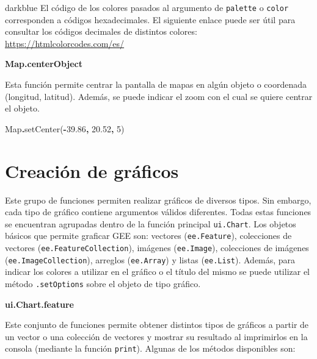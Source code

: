 \documentclass[
  12pt,
  letterpaper,
  twoside]{book}
\newenvironment{Shaded}{\begin{snugshade}}{\end{snugshade}}
\newcommand{\BuiltInTok}[1]{#1}
\newcommand{\DecValTok}[1]{\textcolor[rgb]{0.00,0.00,0.81}{#1}}
\newcommand{\FloatTok}[1]{\textcolor[rgb]{0.00,0.00,0.81}{#1}}
\newcommand{\FunctionTok}[1]{\textcolor[rgb]{0.00,0.00,0.00}{#1}}
\newcommand{\NormalTok}[1]{#1}
\newcommand{\OperatorTok}[1]{\textcolor[rgb]{0.81,0.36,0.00}{\textbf{#1}}}
\begin{document}
\begin{bluebox2}

\begin{awesomeblock}{5pt}{\faLightbulb}{darkblue}
El código de los colores pasados al argumento de \texttt{palette} o \texttt{color} corresponden a códigos hexadecimales. El siguiente enlace puede ser útil para consultar los códigos decimales de distintos colores: \url{https://htmlcolorcodes.com/es/}

\end{awesomeblock}

\end{bluebox2}

\textbf{Map.centerObject}

Esta función permite centrar la pantalla de mapas en algún objeto o coordenada (longitud, latitud). Además, se puede indicar el zoom con el cual se quiere centrar el objeto.

\begin{Shaded}
\begin{Highlighting}[]
\BuiltInTok{Map}\OperatorTok{.}\FunctionTok{setCenter}\NormalTok{(}\OperatorTok{{-}}\FloatTok{39.86}\OperatorTok{,} \FloatTok{20.52}\OperatorTok{,} \DecValTok{5}\NormalTok{)}
\end{Highlighting}
\end{Shaded}

\hypertarget{creaciuxf3n-de-gruxe1ficos}{%
\section{Creación de gráficos}\label{creaciuxf3n-de-gruxe1ficos}}

Este grupo de funciones permiten realizar gráficos de diversos tipos. Sin embargo, cada tipo de gráfico contiene argumentos válidos diferentes. Todas estas funciones se encuentran agrupadas dentro de la función principal \texttt{ui.Chart}. Los objetos básicos que permite graficar GEE son: vectores (\texttt{ee.Feature}), colecciones de vectores (\texttt{ee.FeatureCollection}), imágenes (\texttt{ee.Image}), colecciones de imágenes (\texttt{ee.ImageCollection}), arreglos (\texttt{ee.Array}) y listas (\texttt{ee.List}). Además, para indicar los colores a utilizar en el gráfico o el título del mismo se puede utilizar el método \texttt{.setOptions} sobre el objeto de tipo gráfico.

\textbf{ui.Chart.feature}

Este conjunto de funciones permite obtener distintos tipos de gráficos a partir de un vector o una colección de vectores y mostrar su resultado al imprimirlos en la consola (mediante la función \texttt{print}). Algunas de los métodos disponibles son:
\end{document}

